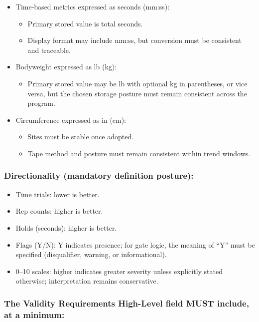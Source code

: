 \documentclass[10pt]{article}
\begin{document}
\begin{itemize}
\item Time-based metrics expressed as seconds (mm:ss):
  \begin{itemize}
  \item Primary stored value is total seconds.
  \item Display format may include mm:ss, but conversion must be consistent and traceable.
  \end{itemize}
\item Bodyweight expressed as lb (kg):
  \begin{itemize}
  \item Primary stored value may be lb with optional kg in parentheses, or vice versa, but the chosen storage posture must remain consistent across the program.
  \end{itemize}
\item Circumference expressed as in (cm):
  \begin{itemize}
  \item Sites must be stable once adopted.
  \item Tape method and posture must remain consistent within trend windows.
  \end{itemize}
\end{itemize}

\subsubsection*{Directionality (mandatory definition posture):}

\begin{itemize}
\item Time trials: lower is better.
\item Rep counts: higher is better.
\item Holds (seconds): higher is better.
\item Flags (Y/N): Y indicates presence; for gate logic, the meaning of “Y” must be specified (disqualifier, warning, or informational).
\item 0–10 scales: higher indicates greater severity unless explicitly stated otherwise; interpretation remains conservative.
\end{itemize}

\subsubsection*{The Validity Requirements High-Level field \textbf{MUST} include, at a minimum:}
\end{document}
